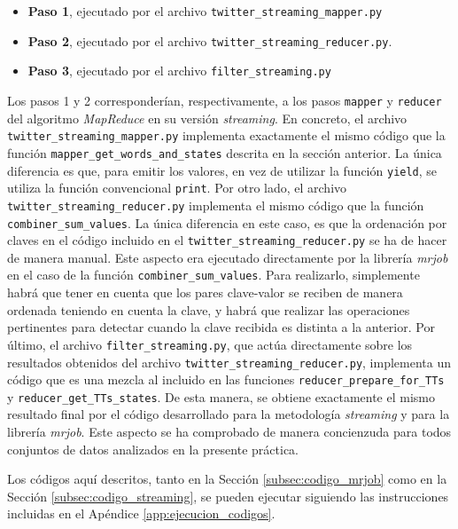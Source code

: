 \documentclass[10pt, spanish]{article}
\begin{document}
\begin{itemize}
\item \textbf{Paso 1}, ejecutado por el archivo \texttt{twitter\_streaming\_mapper.py}
\item \textbf{Paso 2}, ejecutado por el archivo \texttt{twitter\_streaming\_reducer.py}.
\item \textbf{Paso 3}, ejecutado por el archivo \texttt{filter\_streaming.py}
\end{itemize}

Los pasos 1 y 2 corresponderían, respectivamente, a los pasos \texttt{mapper} y \texttt{reducer} del algoritmo \textit{MapReduce} en su versión \textit{streaming}. En concreto, el archivo \texttt{twitter\_streaming\_mapper.py} implementa exactamente el mismo código que la función \texttt{mapper\_get\_words\_and\_states} descrita en la sección anterior. La única diferencia es que, para emitir los valores, en vez de utilizar la función \texttt{yield}, se utiliza la función convencional \texttt{print}. Por otro lado, el archivo \texttt{twitter\_streaming\_reducer.py} implementa el mismo código que la función \texttt{combiner\_sum\_values}. La única diferencia en este caso, es que la ordenación por claves en el código incluido en el \texttt{twitter\_streaming\_reducer.py} se ha de hacer de manera manual. Este aspecto era ejecutado directamente por la librería \textit{mrjob} en el caso de la función \texttt{combiner\_sum\_values}. Para realizarlo, simplemente habrá que tener en cuenta que los pares clave-valor se reciben de manera ordenada teniendo en cuenta la clave, y habrá que realizar las operaciones pertinentes para detectar cuando la clave recibida es distinta a la anterior. Por último, el archivo \texttt{filter\_streaming.py}, que actúa directamente sobre los resultados obtenidos del archivo \texttt{twitter\_streaming\_reducer.py}, implementa un código que es una mezcla al incluido en las funciones \texttt{reducer\_prepare\_for\_TTs} y \texttt{reducer\_get\_TTs\_states}. De esta manera, se obtiene exactamente el mismo resultado final por el código desarrollado para la metodología \textit{streaming} y para la librería \textit{mrjob}. Este aspecto se ha comprobado de manera concienzuda para todos conjuntos de datos analizados en la presente práctica.

Los códigos aquí descritos, tanto en la Sección \ref{subsec:codigo_mrjob} como en la Sección \ref{subsec:codigo_streaming}, se pueden ejecutar siguiendo las instrucciones incluidas en el Apéndice \ref{app:ejecucion_codigos}.
\end{document}
